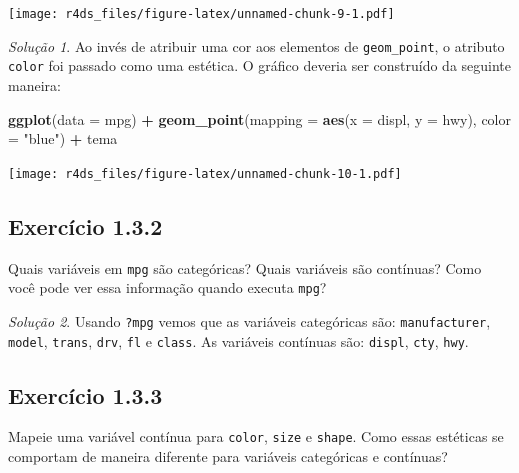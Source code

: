 \documentclass[
]{latex/krantz}
\newenvironment{Shaded}{\begin{snugshade}}{\end{snugshade}}
\newcommand{\AttributeTok}[1]{\textcolor[rgb]{0.13,0.29,0.53}{#1}}
\newcommand{\FunctionTok}[1]{\textcolor[rgb]{0.13,0.29,0.53}{\textbf{#1}}}
\newcommand{\NormalTok}[1]{#1}
\newcommand{\SpecialCharTok}[1]{\textcolor[rgb]{0.81,0.36,0.00}{\textbf{#1}}}
\newcommand{\StringTok}[1]{\textcolor[rgb]{0.31,0.60,0.02}{#1}}
\theoremstyle{definition}
\theoremstyle{definition}
\theoremstyle{definition}
\theoremstyle{definition}
\theoremstyle{remark}
\newtheorem*{solution}{Solução}
\begin{document}
\texttt{[image: r4ds\_files/figure-latex/unnamed-chunk-9-1.pdf]}

\begin{solution}
Ao invés de atribuir uma cor aos elementos de \texttt{geom\_point}, o atributo \texttt{color} foi passado como uma estética. O gráfico deveria ser construído da seguinte maneira:

\begin{Shaded}
\begin{Highlighting}[]
\FunctionTok{ggplot}\NormalTok{(}\AttributeTok{data =}\NormalTok{ mpg) }\SpecialCharTok{+}
    \FunctionTok{geom\_point}\NormalTok{(}\AttributeTok{mapping =} \FunctionTok{aes}\NormalTok{(}\AttributeTok{x =}\NormalTok{ displ, }\AttributeTok{y =}\NormalTok{ hwy), }\AttributeTok{color =} \StringTok{"blue"}\NormalTok{) }\SpecialCharTok{+}
\NormalTok{    tema}
\end{Highlighting}
\end{Shaded}

\texttt{[image: r4ds\_files/figure-latex/unnamed-chunk-10-1.pdf]}
\end{solution}

\hypertarget{exr1-3-2}{%
\subsection*{Exercício 1.3.2}\label{exr1-3-2}}

Quais variáveis em \texttt{mpg} são categóricas? Quais variáveis são contínuas? Como você pode ver essa informação quando executa \texttt{mpg}?

\begin{solution}
Usando \texttt{?mpg} vemos que as variáveis categóricas são: \texttt{manufacturer}, \texttt{model}, \texttt{trans}, \texttt{drv}, \texttt{fl} e \texttt{class}. As variáveis contínuas são: \texttt{displ}, \texttt{cty}, \texttt{hwy}.
\end{solution}

\hypertarget{exr1-3-3}{%
\subsection*{Exercício 1.3.3}\label{exr1-3-3}}

Mapeie uma variável contínua para \texttt{color}, \texttt{size} e \texttt{shape}. Como essas estéticas se comportam de maneira diferente para variáveis categóricas e contínuas?
\end{document}
